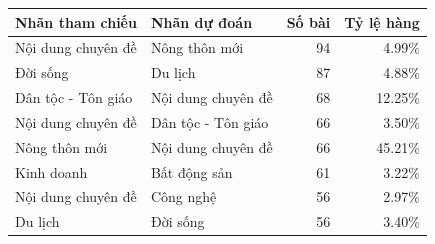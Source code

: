 \begin{tabularx}{\linewidth}{>{\raggedright\arraybackslash}X>{\raggedright\arraybackslash}Xrr}
\toprule
Nhãn tham chiếu & Nhãn dự đoán & Số bài & Tỷ lệ hàng\\\midrule
Nội dung chuyên đề & Nông thôn mới & 94 & 4.99\%\\
Đời sống & Du lịch & 87 & 4.88\%\\
Dân tộc - Tôn giáo & Nội dung chuyên đề & 68 & 12.25\%\\
Nội dung chuyên đề & Dân tộc - Tôn giáo & 66 & 3.50\%\\
Nông thôn mới & Nội dung chuyên đề & 66 & 45.21\%\\
Kinh doanh & Bất động sản & 61 & 3.22\%\\
Nội dung chuyên đề & Công nghệ & 56 & 2.97\%\\
Du lịch & Đời sống & 56 & 3.40\%\\
\bottomrule\end{tabularx}
